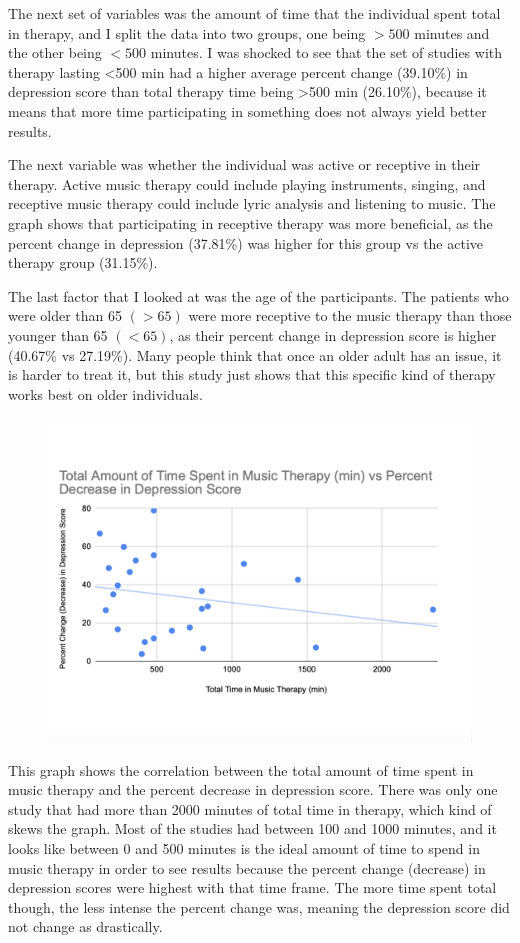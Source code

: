 \documentclass[12pt]{article}
\begin{document}
 The next set of variables was the amount of time that the individual spent total in therapy, and I split the data into two groups, one being $>500$ minutes and the other being $<500$ minutes. I was shocked to see that the set of studies with therapy lasting <500 min had a higher average percent change (39.10\%) in depression score than total therapy time being >500 min (26.10\%), because it means that more time participating in something does not always yield better results. 
 
 The next variable was whether the individual was active or receptive in their therapy. Active music therapy could include playing instruments, singing, and receptive music therapy could include lyric analysis and listening to music. The graph shows that participating in receptive therapy was more beneficial, as the percent change in depression (37.81\%) was higher  for this group vs the active therapy group (31.15\%). 
 
 The last factor that I looked at was the age of the participants. The patients who were older than 65 $(>65)$ were more receptive to the music therapy than those younger than 65 $(<65)$, as their percent change in depression score is higher (40.67\% vs 27.19\%). Many people think that once an older adult has an issue, it is harder to treat it, but this study just shows that this specific kind of therapy works best on older individuals.

 \begin{figure}[hbt!]
  \centering
  \includegraphics[width=12 cm]{CHART3.png}
  \label{fig:chart3}
\end{figure}

 This graph shows the correlation between the total amount of time spent in music therapy and the percent decrease in depression score. There was only one study that had more than 2000 minutes of total time in therapy, which kind of skews the graph. Most of the studies had between 100 and 1000 minutes, and it looks like between 0 and 500 minutes is the ideal amount of time to spend in music therapy in order to see results because the percent change (decrease) in depression scores were highest with that time frame. The more time spent total though, the less intense the percent change was, meaning the depression score did not change as drastically. 
\end{document}
